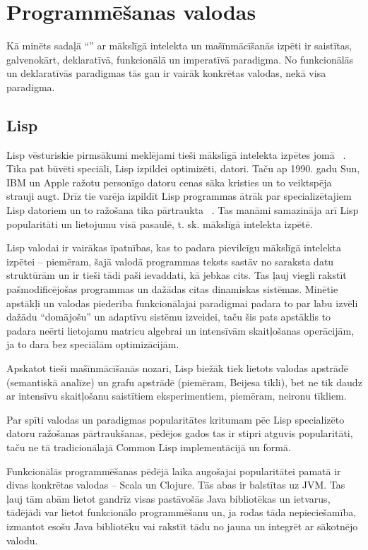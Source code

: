 \documentclass{ludis}
\begin{document}
\section{Programmēšanas valodas} \label{sec:languages}
Kā minēts sadaļā ``'' ar mākslīgā intelekta un mašīnmācīšanās izpēti ir saistītas, galvenokārt, deklaratīvā, funkcionālā un imperatīvā paradigma. No funkcionālās un deklaratīvās paradigmas tās gan ir vairāk konkrētas valodas, nekā visa paradigma.

\subsection{Lisp}
Lisp vēsturiskie pirmsākumi meklējami tieši mākslīgā intelekta izpētes jomā ~\cite{hist_lisp}. Tika pat būvēti speciāli, Lisp izpildei optimizēti, datori. Taču ap 1990. gadu Sun, IBM un Apple ražotu personīgo datoru cenas sāka kristies un to veiktspēja strauji augt. Drīz tie varēja izpildīt Lisp programmas ātrāk par specializētajiem Lisp datoriem un to ražošana tika pārtraukta ~\cite[p.~209--210]{crevier_1993}. Tas manāmi samazināja arī Lisp popularitāti un lietojumu visā pasaulē, t. sk. mākslīgā intelekta izpētē.

Lisp valodai ir vairākas īpatnības, kas to padara pievilcīgu mākslīgā intelekta izpētei -- piemēram, šajā valodā programmas teksts sastāv no saraksta datu struktūrām un ir tieši tādi paši ievaddati, kā jebkas cits. Tas ļauj viegli rakstīt pašmodificējošas programmas un dažādas citas dinamiskas sistēmas. Minētie apstākļi un valodas piederība funkcionālajai paradigmai padara to par labu izvēli dažādu ``domājošu'' un adaptīvu sistēmu izveidei, taču šis pats apstāklis to padara neērti lietojamu matricu algebrai un intensīvām skaitļošanas operācijām, ja to dara bez speciālām optimizācijām.

Apskatot tieši mašīnmācīšanās nozari, Lisp biežāk tiek lietots valodas apstrādē (semantiskā analīze) un grafu apstrādē (piemēram, Beijesa tīkli), bet ne tik daudz ar intensīvu skaitļošanu saistītiem eksperimentiem, piemēram, neironu tīkliem.

Par spīti valodas un paradigmas popularitātes kritumam pēc Lisp specializēto datoru ražošanas pārtraukšanas, pēdējos gados tas ir stipri atguvis popularitāti, taču ne tā tradicionālajā Common Lisp implementācijā un formā.

Funkcionālās programmēšanas pēdējā laika augošajai popularitātei pamatā ir divas konkrētas valodas -- Scala un Clojure. Tās abas ir balstītas uz JVM. Tas ļauj tām abām lietot gandrīz visas pastāvošās Java bibliotēkas un ietvarus, tādējādi var lietot funkcionālo programmēšanu un, ja rodas tāda nepieciešamība, izmantot esošu Java bibliotēku vai rakstīt tādu no jauna un integrēt ar sākotnējo valodu.
\end{document}
